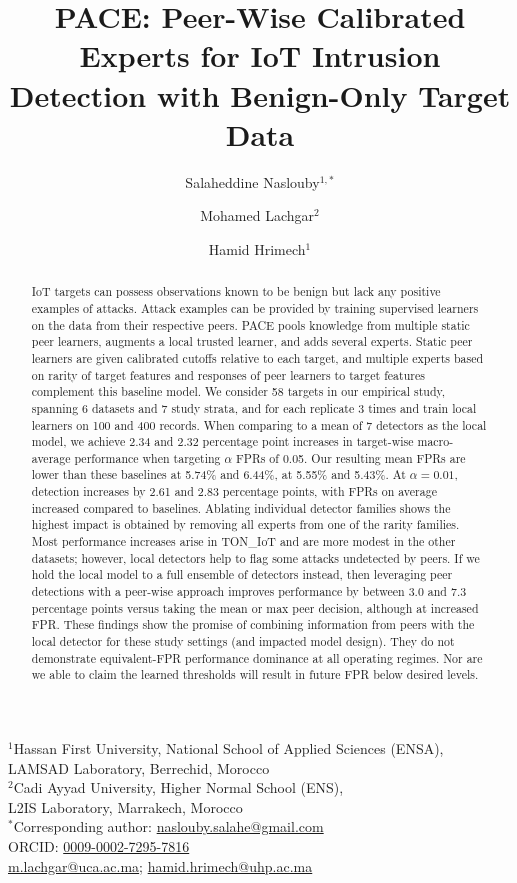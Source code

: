 \documentclass[11pt]{article}
\title{PACE: Peer-Wise Calibrated Experts for IoT Intrusion Detection with Benign-Only Target Data}
\author{Salaheddine Naslouby$^{1,*}$ \and Mohamed Lachgar$^2$ \and Hamid Hrimech$^1$}
\date{}
\begin{document}
\maketitle
\begin{center}\small
$^1$Hassan First University, National School of Applied Sciences (ENSA),\\
LAMSAD Laboratory, Berrechid, Morocco\\[3pt]
$^2$Cadi Ayyad University, Higher Normal School (ENS),\\
L2IS Laboratory, Marrakech, Morocco\\[5pt]
$^*$Corresponding author: \href{mailto:naslouby.salahe@gmail.com}{naslouby.salahe@gmail.com}\\
ORCID: \href{https://orcid.org/0009-0002-7295-7816}{0009-0002-7295-7816}\\
\href{mailto:m.lachgar@uca.ac.ma}{m.lachgar@uca.ac.ma};
\href{mailto:hamid.hrimech@uhp.ac.ma}{hamid.hrimech@uhp.ac.ma}
\end{center}
\begin{abstract}
IoT targets can possess observations known to be benign but lack any positive examples of attacks. Attack examples can be provided by training supervised learners on the data from their respective peers. PACE pools knowledge from multiple static peer learners, augments a local trusted learner, and adds several experts. Static peer learners are given calibrated cutoffs relative to each target, and multiple experts based on rarity of target features and responses of peer learners to target features complement this baseline model. We consider 58 targets in our empirical study, spanning 6 datasets and 7 study strata, and for each replicate 3 times and train local learners on 100 and 400 records. When comparing to a mean of 7 detectors as the local model, we achieve 2.34 and 2.32 percentage point increases in target-wise macro-average performance when targeting $\alpha$ FPRs of 0.05. Our resulting mean FPRs are lower than these baselines at 5.74\% and 6.44\%, at 5.55\% and 5.43\%. At $\alpha=0.01$, detection increases by 2.61 and 2.83 percentage points, with FPRs on average increased compared to baselines. Ablating individual detector families shows the highest impact is obtained by removing all experts from one of the rarity families. Most performance increases arise in TON\_IoT and are more modest in the other datasets; however, local detectors help to flag some attacks undetected by peers. If we hold the local model to a full ensemble of detectors instead, then leveraging peer detections with a peer-wise approach improves performance by between 3.0 and 7.3 percentage points versus taking the mean or max peer decision, although at increased FPR. These findings show the promise of combining information from peers with the local detector for these study settings (and impacted model design). They do not demonstrate equivalent-FPR performance dominance at all operating regimes. Nor are we able to claim the learned thresholds will result in future FPR below desired levels.
\end{abstract}
\end{document}
